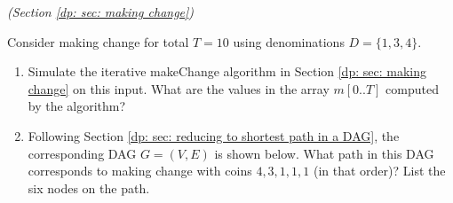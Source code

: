 \documentclass[11pt]{article}
\begin{document}

{}




\newpage

\problem \emph{(Section \ref{dp: sec: making change})}

Consider making change for total $T=10$ using denominations $D=\{1, 3, 4\}$.

\begin{enumerate}[label=(\alph*)]
  
\item Simulate the iterative \textsf{makeChange} algorithm in Section \ref{dp: sec: making change} on this input.
  What are the values in the array $m[0..T]$ computed by the algorithm?

\item Following Section \ref{dp: sec: reducing to shortest path in a DAG}, the corresponding DAG $G=(V, E)$ is shown below.
  What path in this DAG corresponds to making change with coins $4,3,1,1,1$ (in that order)?
  List the six nodes on the path.
\end{enumerate}

\begin{center}
\end{center}

\setlength{\ITEMHT}{1.5in}
{\injectEnumerate
}
\end{document}

